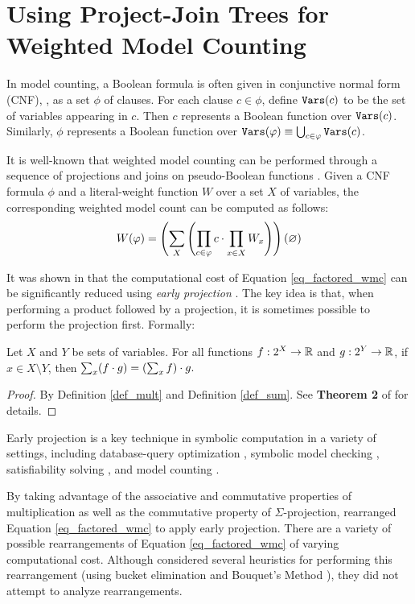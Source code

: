 \section{Using Project-Join Trees for Weighted Model Counting}
\label{sec_jointree}

In model counting, a Boolean formula is often given in conjunctive normal form (CNF), \ie, as a set $\phi$ of clauses.
For each clause $c \in \phi$, define $\texttt{\upshape Vars}(c)$ to be the set of variables appearing in $c$.
Then $c$ represents a Boolean function over $\texttt{\upshape Vars}(c)$. Similarly, $\phi$ represents a Boolean function over $\texttt{\upshape Vars}(\varphi) \equiv \bigcup_{c \in \varphi} \texttt{\upshape Vars}(c)$. 

It is well-known that weighted model counting can be performed through a sequence of projections and joins on pseudo-Boolean functions \cite{DPV20,DDV19}.
Given a CNF formula $\phi$ and a literal-weight function $W$ over a set $X$ of variables, the corresponding weighted model count can be computed as follows:
\begin{equation}
\label{eq_factored_wmc}
    W(\varphi) = \left( 
        \sum_X
        \left( \prod_{c \in \varphi} c \cdot \prod_{x \in X} W_x \right)
     \right)(\varnothing)
\end{equation}

It was shown in \cite{DPV20} that the computational cost of Equation \ref{eq_factored_wmc} can be significantly reduced using \emph{early projection} \cite{MPPV04}. The key idea is that, when performing a product followed by a projection, it is sometimes possible to perform the projection first. Formally:
\begin{theorem}
\label{thm_early_proj}
    Let $X$ and $Y$ be sets of variables.
    For all functions $f: 2^X \to \mathbb{R}$ and $g: 2^Y \to \mathbb{R}$, if $x \in X \setminus Y$, then $\sum_x (f \cdot g) = \left( \sum_x f \right) \cdot g.$
\end{theorem}
\begin{proof}
    By Definition \ref{def_mult} and Definition \ref{def_sum}. See \textbf{Theorem 2} of \cite{DPV20} for details.
\end{proof}

Early projection is a key technique in symbolic computation in a variety of settings, including database-query optimization \cite{KV00}, symbolic model checking \cite{burch1991symbolic}, satisfiability solving \cite{pan2005symbolic}, and model counting \cite{DPV20}.

By taking advantage of the associative and commutative properties of multiplication as well as the commutative property of $\Sigma$-projection, \cite{DPV20} rearranged Equation \eqref{eq_factored_wmc} to apply early projection.
There are a variety of possible rearrangements of Equation \eqref{eq_factored_wmc} of varying computational cost.
Although \cite{DPV20} considered several heuristics for performing this rearrangement (using bucket elimination \cite{dechter99} and Bouquet's Method \cite{bouquet1999gestion}), they did not attempt to analyze rearrangements.

